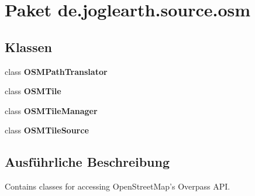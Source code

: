 \section{Paket de.\-joglearth.\-source.\-osm}
\label{namespacede_1_1joglearth_1_1source_1_1osm}
\subsection*{Klassen}
\begin{DoxyCompactItemize}
\item 
class {\bf O\-S\-M\-Path\-Translator}
\item 
class {\bf O\-S\-M\-Tile}
\item 
class {\bf O\-S\-M\-Tile\-Manager}
\item 
class {\bf O\-S\-M\-Tile\-Source}
\end{DoxyCompactItemize}


\subsection{Ausführliche Beschreibung}
Contains classes for accessing Open\-Street\-Map's Overpass A\-P\-I. 